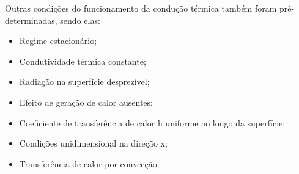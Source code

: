 Outras condições do funcionamento da condução térmica também foram pré-determinadas, sendo elas:

\begin{itemize}[leftmargin=2cm]
    \item Regime estacionário;
    \item Condutividade térmica constante;
    \item Radiação na superfície desprezível;
    \item Efeito de geração de calor ausentes;
    \item Coeficiente de transferência de calor h uniforme ao longo da superfície;
    \item Condições unidimensional na direção x;
    \item Transferência de calor por convecção.
\end{itemize}


